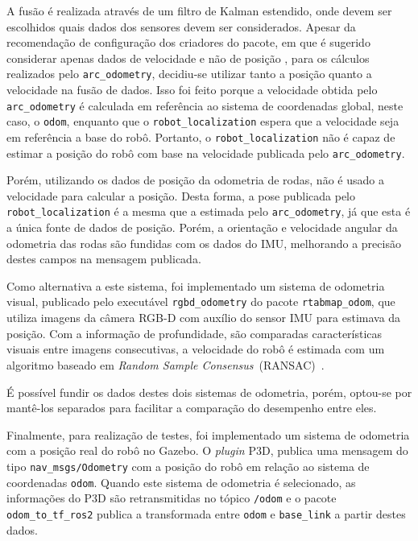 \documentclass[repeatfields,xlists,xpacks,oneside,yearsonly]{ufrgscca}
\begin{document}
A fusão é realizada através de um filtro de Kalman estendido, onde
devem ser escolhidos quais dados dos sensores devem ser considerados.
Apesar da recomendação de configuração dos criadores do pacote, em que
é sugerido considerar apenas dados de velocidade e não de posição
\cite{robot_localization_guide}, para os cálculos realizados pelo
\texttt{arc\_odometry}, decidiu-se utilizar tanto a posição quanto a
velocidade na fusão de dados. Isso foi feito porque a velocidade
obtida pelo \texttt{arc\_odometry} é calculada em referência ao
sistema de coordenadas global, neste caso, o \texttt{odom}, enquanto
que o \texttt{robot\_localization} espera que a velocidade seja em
referência a base do robô. Portanto, o \texttt{robot\_localization}
não é capaz de estimar a posição do robô com base na velocidade
publicada pelo \texttt{arc\_odometry}.

Porém, utilizando os dados de posição da odometria de rodas, não é
usado a velocidade para calcular a posição. Desta forma, a pose
publicada pelo \texttt{robot\_localization} é a mesma que a estimada
pelo \texttt{arc\_odometry}, já que esta é a única fonte de dados de
posição. Porém, a orientação e velocidade angular da odometria das
rodas são fundidas com os dados do IMU, melhorando a precisão destes
campos na mensagem publicada.


Como alternativa a este sistema, foi implementado um sistema de
odometria visual, publicado pelo executável \texttt{rgbd\_odometry}
do pacote \texttt{rtabmap\_odom}, que utiliza imagens da câmera RGB-D
com auxílio do sensor IMU para estimava da posição. Com a informação
de profundidade, são comparadas características visuais entre imagens
consecutivas, a velocidade do robô é estimada com um algoritmo
baseado em \textit{Random Sample
    Consensus}~(RANSAC)~\cite{rtabmap_odom}.

É possível fundir os dados destes dois sistemas de odometria,
porém, optou-se por mantê-los separados para facilitar a comparação
do desempenho entre eles.

Finalmente, para realização de testes, foi implementado um sistema de
odometria com a posição real do robô no Gazebo. O \textit{plugin}
P3D, publica uma mensagem do tipo \texttt{nav\_msgs/Odometry} com a
posição do robô em relação ao sistema de coordenadas \texttt{odom}.
Quando este sistema de odometria é selecionado, as informações do P3D
são retransmitidas no tópico \texttt{/odom} e o pacote
\texttt{odom\_to\_tf\_ros2} publica a transformada entre
\texttt{odom} e \texttt{base\_link} a partir destes dados.
\end{document}
